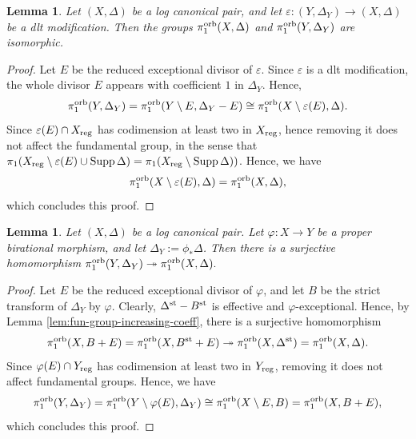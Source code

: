 \documentclass{amsart}
\newtheorem{lemma}[theorem]{Lemma}
\theoremstyle{definition}
\theoremstyle{remark}
\numberwithin{equation}{section}
\newcommand{\cecile}[1]{\textcolor{red}{#1}}
\begin{document}
\begin{lemma}\label{lem:dlt-mod-vs-fun}
Let $(X,\Delta)$ be a log canonical pair, and let $\varepsilon:(Y,\Delta_Y)\to (X,\Delta)$ be a dlt modification.
Then the groups
$\pi_1^{\rm orb}(X,\Delta)$ and $\pi_1^{\rm orb}(Y,\Delta_Y)$ are isomorphic.
\end{lemma}

\begin{proof}
Let $E$ be the reduced exceptional divisor of $\varepsilon$. Since $\varepsilon$ is a dlt modification, the whole divisor $E$ appears with coefficient $1$ in $\Delta_Y$. Hence,
$$\pi_1^{\rm orb}(Y,\Delta_Y) = \pi_1^{\rm orb}(Y\setminus E, \Delta_Y - E)\cong \pi_1^{\rm orb}(X\setminus\varepsilon(E), \Delta).$$
Since $\varepsilon(E)\cap X_{\rm reg}$ has codimension at least two in $X_{\rm reg}$,
hence removing it does not affect the fundamental group, in the sense that $\pi_1(X_{\rm reg}\setminus \varepsilon(E)\cup {\rm Supp}\,\Delta)=
\pi_1(X_{\rm reg}\setminus {\rm Supp}\,\Delta))$.
Hence, we have 
$$\pi_1^{\rm orb}(X\setminus\varepsilon(E), \Delta) = \pi_1^{\rm orb}(X, \Delta),$$ 
which concludes this proof.
\end{proof}


\begin{lemma}\label{lem:fun-under-surj}
Let $(X,\Delta)$ be a log canonical pair.
Let $\varphi:X\rightarrow Y$ be a proper birational morphism,
and let $\Delta_Y:=\phi_*\Delta$.
Then there is a surjective homomorphism
$\pi_1^{\rm orb}(Y,\Delta_Y)\twoheadrightarrow 
\pi_1^{\rm orb}(X,\Delta). $
\end{lemma}

\begin{proof}
Let $E$ be the reduced exceptional divisor of $\varphi$, and let $B$ be the strict transform of $\Delta_Y$ by $\varphi$. Clearly, $\Delta^{\rm st} - B^{\rm st}$ is effective and $\varphi$-exceptional. Hence, by Lemma \ref{lem:fun-group-increasing-coeff}, there is a surjective homomorphism
$$\pi_1^{\rm orb}(X, B + E)=\pi_1^{\rm orb}(X, B^{\rm st} + E)
\twoheadrightarrow\pi_1^{\rm orb}(X,\Delta^{\rm st})=\pi_1^{\rm orb}(X,\Delta).$$
Since $\varphi(E)\cap Y_{\rm reg}$ has codimension at least two in $Y_{\rm reg}$, removing it does not affect fundamental groups. Hence, we have
$$\pi_1^{\rm orb}(Y, \Delta_Y) = \pi_1^{\rm orb}(Y\setminus \varphi(E), \Delta_Y) \cong  \pi_1^{\rm orb}(X\setminus E, B) = \pi_1^{\rm orb}(X, B + E),$$
which concludes this proof.
\end{proof}

\end{document}
